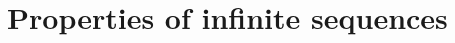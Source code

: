 \documentclass[../book/calcnotes.tex]{subfiles}
\begin{document}
\section{Properties of infinite sequences}
\label{sec:seq-properties}

\begin{exercises}
\end{exercises}
\end{document}
